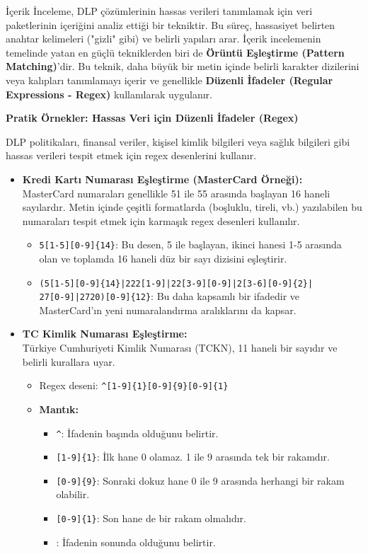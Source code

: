 İçerik İnceleme, DLP çözümlerinin hassas verileri tanımlamak için veri paketlerinin içeriğini analiz ettiği bir tekniktir. Bu süreç, hassasiyet belirten anahtar kelimeleri ("gizli" gibi) ve belirli yapıları arar. İçerik incelemenin temelinde yatan en güçlü tekniklerden biri de \textbf{Örüntü Eşleştirme (Pattern Matching)}'dir. Bu teknik, daha büyük bir metin içinde belirli karakter dizilerini veya kalıpları tanımlamayı içerir ve genellikle \textbf{Düzenli İfadeler (Regular Expressions - Regex)} kullanılarak uygulanır.

\textbf{Pratik Örnekler: Hassas Veri için Düzenli İfadeler (Regex)}

DLP politikaları, finansal veriler, kişisel kimlik bilgileri veya sağlık bilgileri gibi hassas verileri tespit etmek için regex desenlerini kullanır.

\begin{itemize}
    \item \textbf{Kredi Kartı Numarası Eşleştirme (MasterCard Örneği):} \\
    MasterCard numaraları genellikle 51 ile 55 arasında başlayan 16 haneli sayılardır. Metin içinde çeşitli formatlarda (boşluklu, tireli, vb.) yazılabilen bu numaraları tespit etmek için karmaşık regex desenleri kullanılır.
    \begin{itemize}
        \item \texttt{5[1-5][0-9]\{14\}}: Bu desen, 5 ile başlayan, ikinci hanesi 1-5 arasında olan ve toplamda 16 haneli düz bir sayı dizisini eşleştirir.
        \item \texttt{(5[1-5][0-9]\{14\}|222[1-9]|22[3-9][0-9]|2[3-6][0-9]\{2\}|}\\\texttt{27[0-9]|2720)[0-9]\{12\}}: Bu daha kapsamlı bir ifadedir ve MasterCard'ın yeni numaralandırma aralıklarını da kapsar.
    \end{itemize}

    \item \textbf{TC Kimlik Numarası Eşleştirme:} \\
    Türkiye Cumhuriyeti Kimlik Numarası (TCKN), 11 haneli bir sayıdır ve belirli kurallara uyar.
    \begin{itemize}
        \item Regex deseni: \texttt{\textasciicircum[1-9]\{1\}[0-9]\{9\}[0-9]\{1\}\textdollar}
        \item \textbf{Mantık:}
        \begin{itemize}
            \item \texttt{\textasciicircum}: İfadenin başında olduğunu belirtir.
            \item \texttt{[1-9]\{1\}}: İlk hane 0 olamaz. 1 ile 9 arasında tek bir rakamdır.
            \item \texttt{[0-9]\{9\}}: Sonraki dokuz hane 0 ile 9 arasında herhangi bir rakam olabilir.
            \item \texttt{[0-9]\{1\}}: Son hane de bir rakam olmalıdır.
            \item \texttt{\textdollar}: İfadenin sonunda olduğunu belirtir.
        \end{itemize}
    \end{itemize}
\end{itemize}



